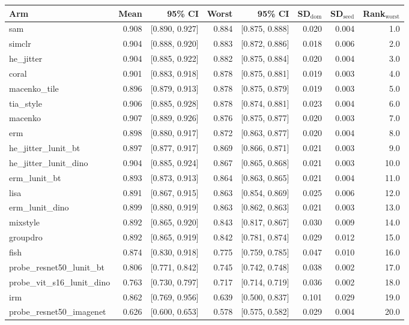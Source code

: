 \begin{tabular}{lrrrrrrr}
\toprule
Arm & Mean & 95\% CI & Worst & 95\% CI & SD$_\text{dom}$ & SD$_\text{seed}$ & Rank$_\text{worst}$ \\
\midrule
sam & 0.908 & [0.890, 0.927] & 0.884 & [0.875, 0.888] & 0.020 & 0.004 & 1.0 \\
simclr & 0.904 & [0.888, 0.920] & 0.883 & [0.872, 0.886] & 0.018 & 0.006 & 2.0 \\
he\_jitter & 0.904 & [0.885, 0.922] & 0.882 & [0.875, 0.884] & 0.020 & 0.004 & 3.0 \\
coral & 0.901 & [0.883, 0.918] & 0.878 & [0.875, 0.881] & 0.019 & 0.003 & 4.0 \\
macenko\_tile & 0.896 & [0.879, 0.913] & 0.878 & [0.875, 0.879] & 0.019 & 0.003 & 5.0 \\
tia\_style & 0.906 & [0.885, 0.928] & 0.878 & [0.874, 0.881] & 0.023 & 0.004 & 6.0 \\
macenko & 0.907 & [0.889, 0.926] & 0.876 & [0.875, 0.877] & 0.020 & 0.003 & 7.0 \\
erm & 0.898 & [0.880, 0.917] & 0.872 & [0.863, 0.877] & 0.020 & 0.004 & 8.0 \\
he\_jitter\_lunit\_bt & 0.897 & [0.877, 0.917] & 0.869 & [0.866, 0.871] & 0.021 & 0.003 & 9.0 \\
he\_jitter\_lunit\_dino & 0.904 & [0.885, 0.924] & 0.867 & [0.865, 0.868] & 0.021 & 0.003 & 10.0 \\
erm\_lunit\_bt & 0.893 & [0.873, 0.913] & 0.864 & [0.863, 0.865] & 0.021 & 0.004 & 11.0 \\
lisa & 0.891 & [0.867, 0.915] & 0.863 & [0.854, 0.869] & 0.025 & 0.006 & 12.0 \\
erm\_lunit\_dino & 0.899 & [0.880, 0.919] & 0.863 & [0.862, 0.863] & 0.021 & 0.003 & 13.0 \\
mixstyle & 0.892 & [0.865, 0.920] & 0.843 & [0.817, 0.867] & 0.030 & 0.009 & 14.0 \\
groupdro & 0.892 & [0.865, 0.919] & 0.842 & [0.781, 0.874] & 0.029 & 0.012 & 15.0 \\
fish & 0.874 & [0.830, 0.918] & 0.775 & [0.759, 0.785] & 0.047 & 0.010 & 16.0 \\
probe\_resnet50\_lunit\_bt & 0.806 & [0.771, 0.842] & 0.745 & [0.742, 0.748] & 0.038 & 0.002 & 17.0 \\
probe\_vit\_s16\_lunit\_dino & 0.763 & [0.730, 0.797] & 0.717 & [0.714, 0.719] & 0.036 & 0.002 & 18.0 \\
irm & 0.862 & [0.769, 0.956] & 0.639 & [0.500, 0.837] & 0.101 & 0.029 & 19.0 \\
probe\_resnet50\_imagenet & 0.626 & [0.600, 0.653] & 0.578 & [0.575, 0.582] & 0.029 & 0.004 & 20.0 \\
\bottomrule
\end{tabular}

